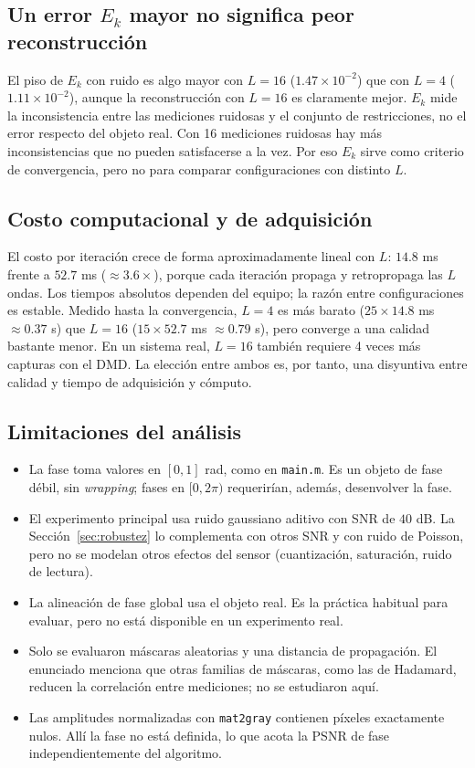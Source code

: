 \documentclass[11pt,a4paper]{article}
\begin{document}
\subsection{Un error \texorpdfstring{$E_k$}{Ek} mayor no significa peor reconstrucción}

El piso de $E_k$ con ruido es algo mayor con $L=16$ ($1.47\times10^{-2}$) que con $L=4$ ($1.11\times10^{-2}$), aunque la reconstrucción con $L=16$ es claramente mejor. $E_k$ mide la inconsistencia entre las mediciones ruidosas y el conjunto de restricciones, no el error respecto del objeto real. Con 16 mediciones ruidosas hay más inconsistencias que no pueden satisfacerse a la vez. Por eso $E_k$ sirve como criterio de convergencia, pero no para comparar configuraciones con distinto $L$.

\subsection{Costo computacional y de adquisición}

El costo por iteración crece de forma aproximadamente lineal con $L$: $14.8$ ms frente a $52.7$ ms ($\approx3.6\times$), porque cada iteración propaga y retropropaga las $L$ ondas. Los tiempos absolutos dependen del equipo; la razón entre configuraciones es estable. Medido hasta la convergencia, $L=4$ es más barato ($25\times14.8$ ms $\approx0.37$ s) que $L=16$ ($15\times52.7$ ms $\approx0.79$ s), pero converge a una calidad bastante menor. En un sistema real, $L=16$ también requiere 4 veces más capturas con el DMD. La elección entre ambos es, por tanto, una disyuntiva entre calidad y tiempo de adquisición y cómputo.

\subsection{Limitaciones del análisis}

\begin{itemize}
    \item La fase toma valores en $[0,1]$ rad, como en \texttt{main.m}. Es un objeto de fase débil, sin \emph{wrapping}; fases en $[0,2\pi)$ requerirían, además, desenvolver la fase.
    \item El experimento principal usa ruido gaussiano aditivo con SNR de $40$ dB. La Sección~\ref{sec:robustez} lo complementa con otros SNR y con ruido de Poisson, pero no se modelan otros efectos del sensor (cuantización, saturación, ruido de lectura).
    \item La alineación de fase global usa el objeto real. Es la práctica habitual para evaluar, pero no está disponible en un experimento real.
    \item Solo se evaluaron máscaras aleatorias y una distancia de propagación. El enunciado menciona que otras familias de máscaras, como las de Hadamard, reducen la correlación entre mediciones; no se estudiaron aquí.
    \item Las amplitudes normalizadas con \texttt{mat2gray} contienen píxeles exactamente nulos. Allí la fase no está definida, lo que acota la PSNR de fase independientemente del algoritmo.
\end{itemize}
\end{document}

